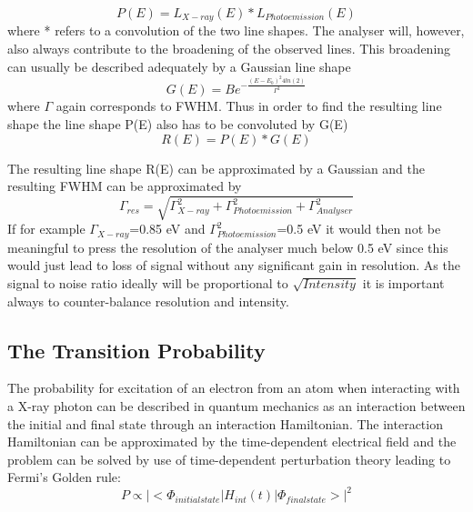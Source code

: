           \begin{equation}
          P(E)= L_{X-ray}(E)*L_{Photoemission}(E)
          \end{equation}
          where * refers to a convolution of the two  line shapes.  The
          analyser  will,  however,  also  always  contribute  to  the
          broadening of the observed lines. This broadening can usually
          be described adequately by a Gaussian line shape
                    \begin{equation}
          G(E)=           Be^{-\frac{(E-E_{0})^{2}4ln(2)}{\Gamma^{2}}}
          \end{equation}
          where $\Gamma$ again corresponds to FWHM.  Thus  in  order  to
          find the resulting line shape the line shape P(E) also has  to
          be convoluted by G(E)
             \begin{equation}
                          R(E) = P(E)*G(E)
                          \end{equation}

          The resulting  line shape  R(E)  can  be  approximated  by  a
          Gaussian and the resulting FWHM can be approximated by
                    \begin{equation}
\Gamma_{res}=\sqrt{\Gamma_{X-ray}^{2}+\Gamma_{Photoemission}^{2}+\Gamma_{Analyser}^{2}}
          \end{equation}
          If    for    example    $\Gamma_{X-ray}$=0.85     eV     and
          $\Gamma_{Photoemission}^{2}$=0.5 eV it  would  then  not  be
          meaningful to press the  resolution  of  the  analyser  much
          below 0.5 eV since this would just lead to  loss  of  signal
          without any significant gain in resolution.
          As the signal to noise ratio ideally will be proportional  to
          $\sqrt{Intensity}$ it is important always to counter-balance
          resolution and intensity.


          \subsection{The Transition Probability}

          The probability for excitation of an electron from  an  atom
          when interacting with a X-ray photon  can  be  described  in
          quantum mechanics as  an  interaction  between  the  initial
          and  final  state  through  an  interaction  Hamiltonian.  The
          interaction  Hamiltonian  can   be   approximated   by   the
          time-dependent electrical field and the problem can be solved
          by use  of  time-dependent  perturbation  theory  leading  to
          Fermi's Golden rule:
                            \begin{equation}
          P  \propto  |<\Phi_{initial  state  }|H_{int}(t)|\Phi_{final
          state}>|^{2}
          \end{equation}

